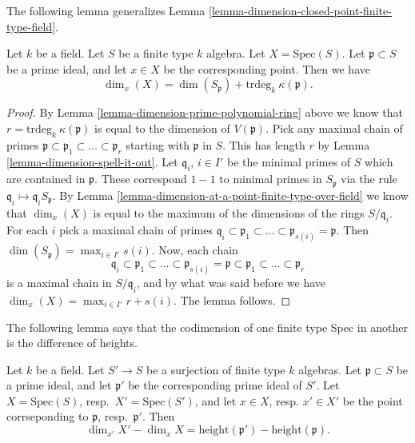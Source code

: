 \noindent
The following lemma generalizes
Lemma \ref{lemma-dimension-closed-point-finite-type-field}.

\begin{lemma}
\label{lemma-dimension-at-a-point-finite-type-field}
Let $k$ be a field.
Let $S$ be a finite type $k$ algebra.
Let $X = \text{Spec}(S)$.
Let $\mathfrak p \subset S$ be a prime ideal,
and let $x \in X$ be the corresponding point.
Then we have
$$
\dim_x(X) = \dim(S_{\mathfrak p}) + \text{trdeg}_k\ \kappa(\mathfrak p).
$$
\end{lemma}

\begin{proof}
By Lemma \ref{lemma-dimension-prime-polynomial-ring} above we know that
$r = \text{trdeg}_k\ \kappa(\mathfrak p)$ is equal to the
dimension of $V(\mathfrak p)$.
Pick any maximal chain of primes
$\mathfrak p \subset \mathfrak p_1 \subset \ldots \subset \mathfrak p_r$
starting with $\mathfrak p$ in $S$.
This has length $r$ by Lemma \ref{lemma-dimension-spell-it-out}.
Let $\mathfrak q_i$, $i \in I'$ be the minimal
primes of $S$ which are contained in $\mathfrak p$.
These correspond $1-1$ to minimal primes in $S_{\mathfrak p}$
via the rule $\mathfrak q_i \mapsto \mathfrak q_iS_{\mathfrak p}$.
By Lemma \ref{lemma-dimension-at-a-point-finite-type-over-field}
we know that $\dim_x(X)$ is equal
to the maximum of the dimensions of the rings $S/\mathfrak q_i$.
For each $i$ pick a maximal chain of primes
$\mathfrak q_i \subset \mathfrak p_1 \subset \ldots \subset \mathfrak p_{s(i)}
= \mathfrak p$.
Then $\dim(S_{\mathfrak p}) = \max_{i \in I'} s(i)$.
Now, each chain
$$
\mathfrak q_i \subset \mathfrak p_1 \subset \ldots \subset
\mathfrak p_{s(i)} = \mathfrak p \subset
\mathfrak p_1 \subset \ldots \subset \mathfrak p_r
$$
is a maximal chain in $S/\mathfrak q_i$, and by what was said
before we have
$\dim_x(X) = \max_{i \in I'} r + s(i)$.
The lemma follows.
\end{proof}

\noindent
The following lemma says that the codimension of one finite type
Spec in another is the difference of heights.

\begin{lemma}
\label{lemma-codimension}
Let $k$ be a field.
Let $S' \to S$ be a surjection of finite type $k$ algebras.
Let $\mathfrak p \subset S$ be a prime ideal,
and let $\mathfrak p'$ be the corresponding prime ideal of $S'$.
Let $X = \text{Spec}(S)$, resp.\ $X' = \text{Spec}(S')$,
and let $x \in X$, resp. $x'\in X'$ be the point corrseponding
to $\mathfrak p$, resp.\ $\mathfrak p'$.
Then
$$
\dim_{x'} X' - \dim_x X =
\text{height}(\mathfrak p') - \text{height}(\mathfrak p).
$$
\end{lemma}

